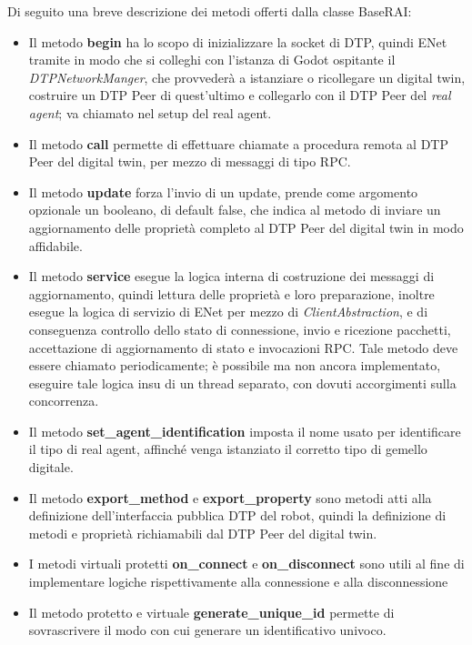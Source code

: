 Di seguito una breve descrizione dei metodi offerti dalla classe BaseRAI:
\begin{itemize}
	\item Il metodo \textbf{begin} ha lo scopo di inizializzare la socket di DTP, quindi ENet tramite in modo che si colleghi con l'istanza di Godot ospitante il \textit{DTPNetworkManger}, che provvederà a istanziare o ricollegare un digital twin, costruire un DTP Peer di quest'ultimo e collegarlo con il DTP Peer del \textit{real agent}; va chiamato nel setup del real agent.
	\item Il metodo \textbf{call} permette di effettuare chiamate a procedura remota al DTP Peer del digital twin, per mezzo di messaggi di tipo RPC.
	\item Il metodo \textbf{update} forza l'invio di un update, prende come argomento opzionale un booleano, di default false, che indica al metodo di inviare un aggiornamento delle proprietà completo al DTP Peer del digital twin in modo affidabile.
	\item Il metodo \textbf{service} esegue la logica interna di costruzione dei messaggi di aggiornamento, quindi lettura delle proprietà e loro preparazione, inoltre esegue la logica di servizio di ENet per mezzo di \textit{ClientAbstraction}, e di conseguenza controllo dello stato di connessione, invio e ricezione pacchetti, accettazione di aggiornamento di stato e invocazioni RPC. Tale metodo deve essere chiamato periodicamente; è possibile ma non ancora implementato, eseguire tale logica insu di un thread separato, con dovuti accorgimenti sulla concorrenza.
	\item Il metodo \textbf{set\_agent\_identification} imposta il nome usato per identificare il tipo di real agent, affinché venga istanziato il corretto tipo di gemello digitale.
	\item Il metodo \textbf{export\_method} e \textbf{export\_property} sono metodi atti alla definizione dell'interfaccia pubblica DTP del robot, quindi la definizione di metodi e proprietà richiamabili dal DTP Peer del digital twin.
	\item I metodi virtuali protetti \textbf{on\_connect} e \textbf{on\_disconnect} sono utili al fine di implementare logiche rispettivamente alla connessione e alla disconnessione
	\item Il metodo protetto e virtuale \textbf{generate\_unique\_id} permette di sovrascrivere il modo con cui generare un identificativo univoco. 
\end{itemize}

